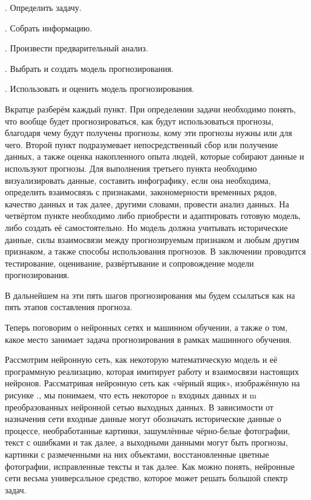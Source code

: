 {  \par {}. Определить задачу.
  \par {}. Собрать информацию.
  \par {}. Произвести предварительный анализ.
  \par {}. Выбрать и создать модель прогнозирования.
  \par {}. Использовать и оценить модель прогнозирования.

  \par \redline Вкратце разберём каждый пункт. При определении задачи необходимо понять, что вообще будет прогнозироваться, как будут использоваться прогнозы, благодаря чему будут получены прогнозы, кому эти прогнозы нужны или для чего. Второй пункт подразумевает непосредственный сбор или получение данных, а также оценка накопленного опыта людей, которые собирают данные и используют прогнозы. Для выполнения третьего пункта необходимо визуализировать данные, составить инфографику, если она необходима, определить взаимосвязь с признаками, закономерности временных рядов, качество данных и так далее, другими словами, провести анализ данных. На четвёртом пункте необходимо либо приобрести и адаптировать готовую модель, либо создать её самостоятельно. Но модель должна учитывать исторические данные, силы взаимосвязи между прогнозируемым признаком и любым другим признаком, а также способы использования прогнозов. В заключении проводится тестирование, оценивание, развёртывание и сопровождение модели прогнозирования.

  \par \redline В дальнейшем на эти пять шагов прогнозирования мы будем ссылаться как на пять этапов составления прогноза.

  \par \redline Теперь поговорим о нейронных сетях и машинном обучении, а также о том, какое место занимает задача прогнозирования в рамках машинного обучения.

  \par \redline Рассмотрим нейронную сеть, как некоторую математическую модель и её программную реализацию, которая имитирует работу и взаимосвязи настоящих нейронов.  Рассматривая нейронную сеть как «чёрный ящик», изображённую на рисунке \thechaptercntr .\theimagecntr, мы понимаем, что есть некоторое n входных данных и m преобразованных нейронной сетью выходных данных. В зависимости от назначения сети входные данные могут обозначать исторические данные о процессе, необработанные картинки, зашумлённые чёрно-белые фотографии, текст с ошибками и так далее, а выходными данными могут быть прогнозы, картинки с размеченными на них объектами, восстановленные цветные фотографии, исправленные тексты и так далее. Как можно понять, нейронные сети весьма универсальное средство, которое может решать большой спектр задач.

}
